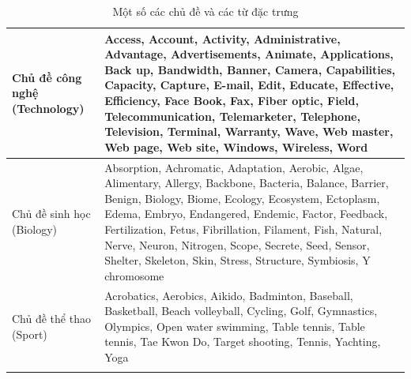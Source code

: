 \documentclass[fontsize=13pt]{scrartcl}
\begin{document}
\textbf{}
\begin{center}
\begin{longtable}{| p{} | p{} |}

\hline 
Chủ đề công nghệ \newline (Technology) & Access, Account, Activity, Administrative, Advantage, Advertisements, Animate, Applications, Back up, Bandwidth, Banner, Camera, Capabilities, Capacity, Capture,  E-mail, Edit, Educate, Effective, Efficiency, Face Book, Fax, Fiber optic, Field, Telecommunication, Telemarketer, Telephone, Television, Terminal, Warranty, Wave, Web master, Web page, Web site, Windows, Wireless, Word   \\
\hline
Chủ đề sinh học \newline (Biology) & Absorption, Achromatic, Adaptation, Aerobic, Algae, Alimentary, Allergy, Backbone, Bacteria, Balance, Barrier, Benign, Biology, Biome, Ecology, Ecosystem, Ectoplasm, Edema, Embryo, Endangered, Endemic, Factor, Feedback, Fertilization, Fetus, Fibrillation, Filament, Fish, Natural, Nerve, Neuron, Nitrogen, Scope, Secrete, Seed, Sensor, Shelter, Skeleton, Skin,  Stress, Structure, Symbiosis,  Y chromosome  \\
\hline
Chủ đề thể thao \newline (Sport) & Acrobatics, Aerobics, Aikido, Badminton, Baseball, Basketball, Beach volleyball, Cycling, Golf, Gymnastics, Olympics, Open water swimming, Table tennis, Table tennis, Tae Kwon Do, Target shooting, Tennis, Yachting, Yoga\\
\hline
\caption{Một số các chủ đề và các từ đặc trưng}
\label{tb:topicword}
\end{longtable}
\end{center}
\end{document}
